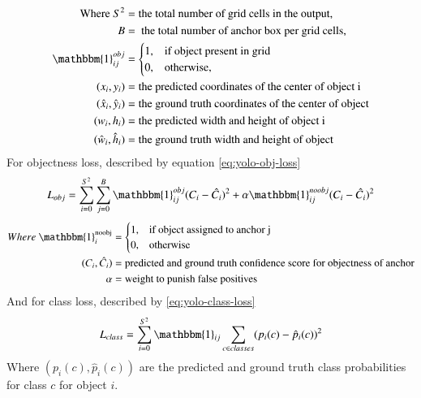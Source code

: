     \begin{align*}
    \text{Where}~S^2  &= \text{the total number of grid cells in the output,}\\
    B &= \text{ the total number of anchor box per grid cells,}\\
    \mathbbm{1}_{ij}^{obj} &= \begin{cases}
                                1, & \text{if object present in grid}\\
                                0, & \text{otherwise,}
                              \end{cases} 
                              \\
    (x_i, y_i) &= \text{the predicted coordinates of the center of object i}\\
    (\hat{x}_i, \hat{y}_i) &= \text{the ground truth coordinates of the center of object}\\
    (w_i, h_i) &= \text{the predicted width and height of object i}\\
    (\hat{w}_i, \hat{h}_i) &= \text{the ground truth width and height of object}
    \end{align*}
    For objectness loss, described by equation \ref{eq:yolo-obj-loss}
    \begin{equation}
      L_{obj} = \sum_{i=0}^{S^2} \sum_{j=0}^B \mathbbm{1}_{ij}^{obj}(C_i - \hat{C}_i)^2  + \alpha \mathbbm{1}_{ij}^{noobj}(C_i - \hat{C}_i)^2
      \label{eq:yolo-obj-loss}
    \end{equation}
    \begin{align*}
    Where~\mathbbm{1}_i^{\text{noobj}} &=\begin{cases} 
                                          1, & \text{if object assigned to anchor j}\\
                                          0, & \text{otherwise} 
                                         \end{cases}\\
          (C_i,\hat{C}_i) &= \text{predicted and ground truth confidence score for objectness of anchor}\\
          \alpha &= \text{weight to punish false positives}
    \end{align*}
    And for class loss, described by \ref{eq:yolo-class-loss}
    \begin{equation}
      L_{class} = \sum_{i=0}^{S^2} \mathbbm{1}_{ij} \sum_{c \in classes} (p_i(c) - \hat{p}_i(c))^2
      \label{eq:yolo-class-loss}
    \end{equation}
    Where $(p_i(c), \hat{p}_i(c))$ are the predicted and ground truth class probabilities for class $c$ for object $i$.

